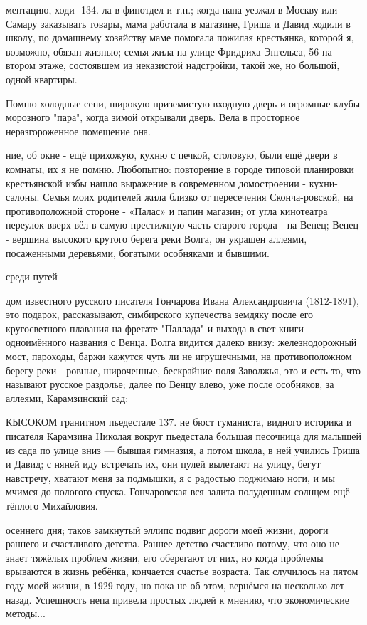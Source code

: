 ментацию, ходи- 134. ла в финотдел и т.п.; когда папа уезжал в Москву или Самару заказывать товары, мама работала в магазине, Гриша и Давид ходили в школу, по домашнему хозяйству маме помогала пожилая крестьянка, которой я, возможно, обязан жизнью; семья жила на улице Фридриха Энгельса, 56 на втором этаже, состоявшем из неказистой надстройки, такой же, но большой, одной квартиры.

Помню холодные сени, широкую приземистую входную дверь и огромные клубы морозного "пара", когда зимой открывали дверь. Вела в просторное неразгороженное помещение она.

ние, об окне - ещё прихожую, кухню с печкой, столовую, были ещё двери в комнаты, их я не помню. Любопытно: повторение в городе типовой планировки крестьянской избы нашло выражение в современном домостроении - кухни-салоны. Семья моих родителей жила близко от пересечения Сконча-ровской, на противоположной стороне - «Палас» и папин магазин; от угла кинотеатра переулок вверх вёл в самую престижную часть старого города - на Венец; Венец - вершина высокого крутого берега реки Волга, он украшен аллеями, посаженными деревьями, богатыми особняками и бывшими.

среди путей

дом известного русского писателя Гончарова Ивана Александровича (1812-1891), это подарок, рассказывают, симбирского купечества земдяку после его кругосветного плавания на фрегате "Паллада" и выхода в свет книги одноимённого названия с Венца. Волга видится далеко внизу: железнодорожный мост, пароходы, баржи кажутся чуть ли не игрушечными, на противоположном берегу реки - ровные, широченные, бескрайние поля Заволжья, это и есть то, что называют русское раздолье; далее по Венцу влево, уже после особняков, за аллеями, Карамзинский сад;

КЫСОКОМ гранитном пьедестале 137. не бюст гуманиста, видного историка и писателя Карамзина Николая вокруг пьедестала большая песочница для малышей из сада по улице вниз — бывшая гимназия, а потом школа, в ней учились Гриша и Давид; с няней иду встречать их, они пулей вылетают на улицу, бегут навстречу, хватают меня за подмышки, я с радостью поджимаю ноги, и мы мчимся до пологого спуска. Гончаровская вся залита полуденным солнцем ещё тёплого Михайловия.

осеннего дня; таков замкнутый эллипс подвиг дороги моей жизни, дороги раннего и счастливого детства. Раннее детство счастливо потому, что оно не знает тяжёлых проблем жизни, его оберегают от них, но когда проблемы врываются в жизнь ребёнка, кончается счастье возраста. Так случилось на пятом году моей жизни, в 1929 году, но пока не об этом, вернёмся на несколько лет назад. Успешность непа привела простых людей к мнению, что экономические методы...

